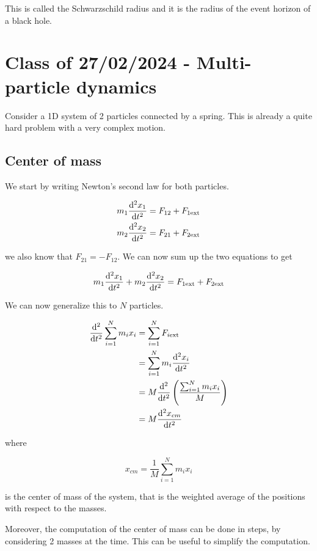 \documentclass[10pt]{extarticle}
\begin{document}
This is called the Schwarzschild radius and it is the radius of the event horizon of a black hole.

\section{Class of 27/02/2024 - Multi-particle dynamics}

Consider a 1D system of 2 particles connected by a spring.
This is already a quite hard problem with a very complex motion.

\subsection{Center of mass}

We start by writing Newton's second law for both particles.

\begin{align*}
    m_1 \dv[2]{x_1}{t} & = F_{12} + F_{1 \text{ext}} \\
    m_2 \dv[2]{x_2}{t} & = F_{21} + F_{2 \text{ext}}
\end{align*}

we also know that $F_{21} = - F_{12}$. We can now sum up the two equations to get

$$
    m_1 \dv[2]{x_1}{t} + m_2 \dv[2]{x_2}{t} = F_{1 \text{ext}} + F_{2 \text{ext}}
$$

We can now generalize this to $N$ particles.

\begin{align*}
    \dv[2]{t} \sum_{i = 1}^N m_i x_i & = \sum_{i = 1}^N F_{i \text{ext}}                             \\
                                     & = \sum_{i = 1}^N m_i \dv[2]{x_i}{t}                           \\
                                     & = M \dv[2]{t} \left( \frac{\sum_{i = 1}^N m_i x_i}{M} \right) \\
                                     & = M \dv[2]{x_{cm}}{t}
\end{align*}

where

$$
    x_{cm} = \frac{1}{M} \sum_{i = 1}^N m_i x_i
$$

is the center of mass of the system, that is the weighted average of the positions with respect to the masses.

Moreover, the computation of the center of mass can be done in steps, by considering 2 masses at the time. This can be useful to simplify the computation.
\end{document}
